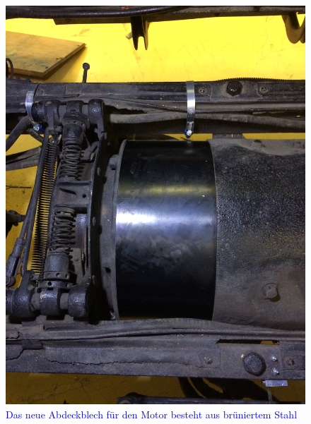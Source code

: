 \begin{landscape}
\begin{figure}[h]
		\includegraphics[angle=180,width=1.30\textwidth]{images/Anhang/Abdeckung.jpg}
	\caption{\textcolor{blue}{Das neue Abdeckblech für den Motor besteht aus brüniertem Stahl}}
	\label{fig:Abdeckung}
\end{figure}\end{landscape}